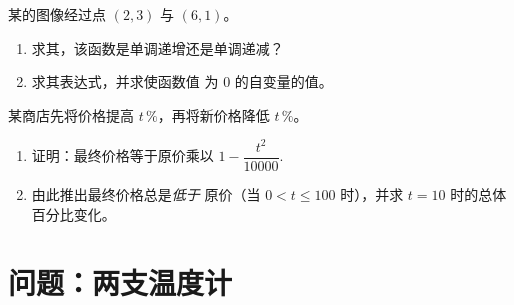 \begin{exercise}[$\star\star$]\label{exo:g9:linfunc:9}
某的图像经过点 $(2, 3)$ 与
$(6, 1)$。
\begin{enumerate}
  \item 求其，该函数是单调递增还是单调递减？
  \item 求其表达式，并求使函数值
        为 $0$ 的自变量的值。
\end{enumerate}
\end{exercise}

\begin{exercise}[$\star\star\star$]\label{exo:g9:linfunc:10}
某商店先将价格提高 $t\,\%$，再将新价格降低
$t\,\%$。
\begin{enumerate}
  \item 证明：最终价格等于原价乘以
        $1 - \dfrac{t^2}{10000}$.
  \item 由此推出最终价格总是\emph{低于}
        原价（当 $0 < t \leq 100$ 时），并求
        $t = 10$ 时的总体百分比变化。
\end{enumerate}
\end{exercise}

\section{问题：两支温度计}

